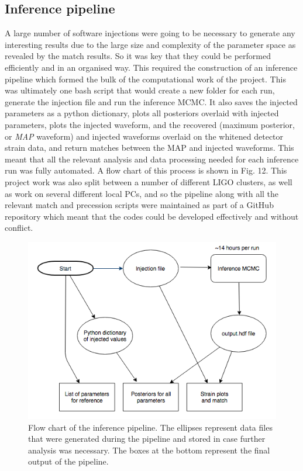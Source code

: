 \documentclass[11pt]{article}
\begin{document}
\subsection{Inference pipeline}
A large number of software injections were going to be necessary to generate any interesting results due to the large size and complexity of the parameter space as revealed by the match results. So it was key that they could be performed efficiently and in an organised way. This required the construction of an inference pipeline which formed the bulk of the computational work of the project. This was ultimately one bash script that would create a new folder for each run, generate the injection file and run the inference MCMC.  It also saves the injected parameters as a python dictionary, plots all posteriors overlaid with injected parameters, plots the injected waveform, and the recovered (maximum posterior, or \textit{MAP} waveform) and injected waveforms overlaid on the whitened detector strain data, and return matches between the MAP and injected waveforms. This meant that all the relevant analysis and data processing needed for each inference run was fully automated. A flow chart of this process is shown in Fig. 12.
This project work was also split between a number of different LIGO clusters, as well as work on several different local PCs, and so the pipeline along with all the relevant match and precession scripts were maintained as part of a GitHub repository which meant that the codes could be developed effectively and without conflict.
\begin{figure}[h]
	\includegraphics[scale=0.55]{fig13.png}
	\centering
	\caption{Flow chart of the inference pipeline. The ellipses represent data files that were generated during the pipeline and stored in case further analysis was necessary. The boxes at the bottom represent the final output of the pipeline.}
	\centering
\end{figure}
\end{document}
